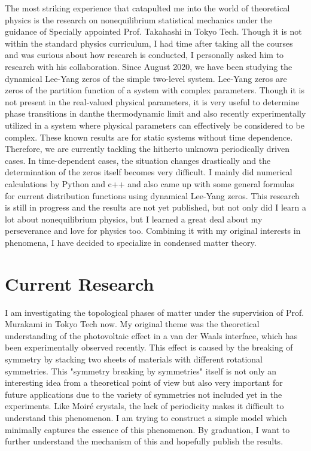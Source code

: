 \documentclass[a4]{article}
\begin{document}
The most striking experience that catapulted me into the world of theoretical physics is the research on nonequilibrium statistical mechanics under the guidance of Specially appointed Prof. Takahashi in Tokyo Tech. Though it is not within the standard physics curriculum, I had time after taking all the courses and was curious about how research is conducted, I personally asked him to research with his collaboration. Since August 2020, we have been studying the dynamical Lee-Yang zeros of the simple two-level system. Lee-Yang zeros are zeros of the partition function of a system with complex parameters. Though it is not present in the real-valued physical parameters, it is very useful to determine phase transitions in danthe thermodynamic limit and also recently experimentally utilized in a system where physical parameters can effectively be considered to be complex. These known results are for static systems without time dependence. Therefore, we are currently tackling the hitherto unknown periodically driven cases. In time-dependent cases, the situation changes drastically and the determination of the zeros itself becomes very difficult. I mainly did numerical calculations by Python and c++ and also came up with some general formulas for current distribution functions using dynamical Lee-Yang zeros. This research is still in progress and the results are not yet published, but not only did I learn a lot about nonequilibrium physics, but I learned a great deal about my perseverance and love for physics too. Combining it with my original interests in phenomena, I have decided to specialize in condensed matter theory.\par

\section{Current Research}
I am investigating the topological phases of matter under the supervision of Prof. Murakami in Tokyo Tech now. My original theme was the theoretical understanding of the photovoltaic effect in a van der Waals interface, which has been experimentally observed recently. This effect is caused by the breaking of symmetry by stacking two sheets of materials with different rotational symmetries. This "symmetry breaking by symmetries" itself is not only an interesting idea from a theoretical point of view but also very important for future applications due to the variety of symmetries not included yet in the experiments. Like Moir\'{e} crystals, the lack of periodicity makes it difficult to understand this phenomenon. I am trying to construct a simple model which minimally captures the essence of this phenomenon. By graduation, I want to further understand the mechanism of this and hopefully publish the results. \par
\end{document}
